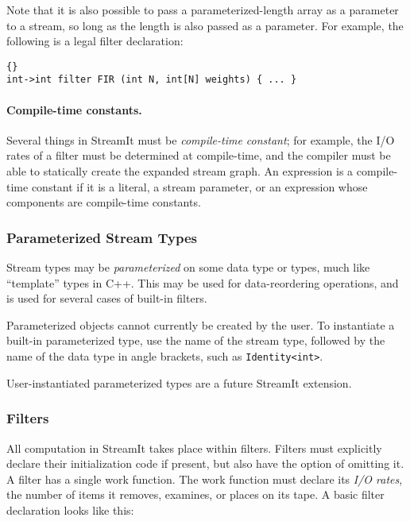 \documentclass[11pt]{article}
\begin{document}
Note that it is also possible to pass a parameterized-length array as
a parameter to a stream, so long as the length is also passed as a
parameter. For example, the following is a legal filter declaration:

\begin{lstlisting}{}
int->int filter FIR (int N, int[N] weights) { ... }
\end{lstlisting}

\paragraph{Compile-time constants.}  Several things in StreamIt must
be \emph{compile-time constant}; for example, the I/O rates of a
filter must be determined at compile-time, and the compiler must be
able to statically create the expanded stream graph.  An expression is a
compile-time constant if it is a literal, a stream parameter, or an
expression whose components are compile-time constants.

\subsubsection{Parameterized Stream Types}

Stream types may be \emph{parameterized} on some data type or types,
much like ``template'' types in C++.  This may be used for
data-reordering operations, and is used for several cases of built-in
filters.

Parameterized objects cannot currently be created by the user.  To
instantiate a built-in parameterized type, use the name of the stream
type, followed by the name of the data type in angle brackets, such as
\lstinline|Identity<int>|.

\begin{note}
User-instantiated parameterized types are a future StreamIt
extension.
\end{note}

\subsubsection{Filters}

All computation in StreamIt takes place within filters.  Filters must
explicitly declare their initialization code if present, but also have
the option of omitting it.  A filter has a single work function.
The work
function must declare its \emph{I/O rates}, the number of items 
it removes, examines, or places on its tape.  A basic filter
declaration looks like this:
\end{document}
